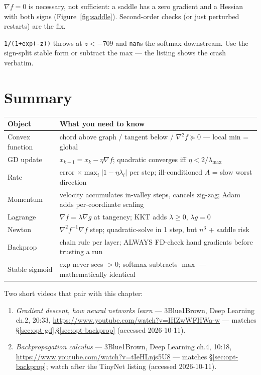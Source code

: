 \begin{tripwire}
$\nabla f=0$ is necessary, not sufficient: a saddle has a zero gradient
and a Hessian with both signs (Figure~\ref{fig:saddle}). Second-order
checks (or just perturbed restarts) are the fix.
\end{tripwire}

\begin{tripwire}
\texttt{1/(1+exp(-z))} throws at $z<-709$ and \texttt{nan}s the softmax
downstream. Use the sign-split stable form or subtract the max ---
the listing shows the crash verbatim.
\end{tripwire}

\section{Summary}

\begin{center}
\begin{tabularx}{\textwidth}{l>{\raggedright\arraybackslash}X}
\toprule
\textbf{Object} & \textbf{What you need to know}\\
\midrule
Convex function & chord above graph / tangent below / $\nabla^2f\succeq0$
--- local min = global \\
GD update & $x_{k+1}=x_k-\eta\nabla f$; quadratic converges iff
$\eta<2/\lambda_{\max}$ \\
Rate & error $\times\max_i|1-\eta\lambda_i|$ per step; ill-conditioned
$A$ = slow worst direction \\
Momentum & velocity accumulates in-valley steps, cancels zig-zag; Adam
adds per-coordinate scaling \\
Lagrange & $\nabla f=\lambda\nabla g$ at tangency; KKT adds
$\lambda\ge0$, $\lambda g=0$ \\
Newton & $\nabla^2f^{-1}\nabla f$ step; quadratic-solve in 1 step, but
$n^3$ + saddle risk \\
Backprop & chain rule per layer; ALWAYS FD-check hand gradients before
trusting a run \\
Stable sigmoid & exp never sees $>0$; softmax subtracts $\max$ ---
mathematically identical \\
\bottomrule
\end{tabularx}
\end{center}

\begin{rulebox}
Two short videos that pair with this chapter:
\begin{enumerate}
\item \emph{Gradient descent, how neural networks learn} ---
3Blue1Brown, Deep Learning ch.2, 20:33,
\url{https://www.youtube.com/watch?v=IHZwWFHWa-w} --- matches
\S\ref{sec:opt-gd},\S\ref{sec:opt-backprop} (accessed 2026-10-11).
\item \emph{Backpropagation calculus} --- 3Blue1Brown, Deep Learning
ch.4, 10:18, \url{https://www.youtube.com/watch?v=tIeHLnjs5U8} ---
matches \S\ref{sec:opt-backprop}; watch after the TinyNet listing
(accessed 2026-10-11).
\end{enumerate}
\end{rulebox}

